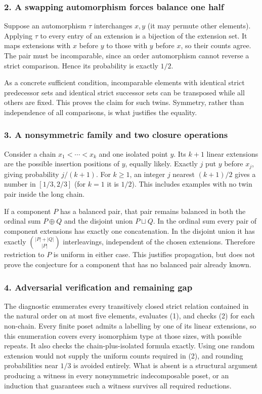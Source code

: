 \documentclass[11pt,a4paper]{article}
\begin{document}
\subsubsection{2. A swapping automorphism forces balance one half}
Suppose an automorphism $\tau$ interchanges $x,y$ (it may permute other elements). Applying $\tau$ to every entry of an extension is a bijection of the extension set. It maps extensions with $x$ before $y$ to those with $y$ before $x$, so their counts agree. The pair must be incomparable, since an order automorphism cannot reverse a strict comparison. Hence its probability is exactly $1/2$.

As a concrete sufficient condition, incomparable elements with identical strict predecessor sets and identical strict successor sets can be transposed while all others are fixed. This proves the claim for such twins. Symmetry, rather than independence of all comparisons, is what justifies the equality.

\subsubsection{3. A nonsymmetric family and two closure operations}
Consider a chain $x_1<\cdots<x_k$ and one isolated point $y$. Its $k+1$ linear extensions are the possible insertion positions of $y$, equally likely. Exactly $j$ put $y$ before $x_j$, giving probability $j/(k+1)$. For $k\geq1$, an integer $j$ nearest $(k+1)/2$ gives a number in $[1/3,2/3]$ (for $k=1$ it is $1/2$). This includes examples with no twin pair inside the long chain.

If a component $P$ has a balanced pair, that pair remains balanced in both the ordinal sum $P\oplus Q$ and the disjoint union $P\sqcup Q$. In the ordinal sum every pair of component extensions has exactly one concatenation. In the disjoint union it has exactly $\binom{|P|+|Q|}{|P|}$ interleavings, independent of the chosen extensions. Therefore restriction to $P$ is uniform in either case. This justifies propagation, but does not prove the conjecture for a component that has no balanced pair already known.

\subsubsection{4. Adversarial verification and remaining gap}
The diagnostic enumerates every transitively closed strict relation contained in the natural order on at most five elements, evaluates (1), and checks (2) for each non-chain. Every finite poset admits a labelling by one of its linear extensions, so this enumeration covers every isomorphism type at those sizes, with possible repeats. It also checks the chain-plus-isolated formula exactly. Using one random extension would not supply the uniform counts required in (2), and rounding probabilities near $1/3$ is avoided entirely. What is absent is a structural argument producing a witness in every nonsymmetric indecomposable poset, or an induction that guarantees such a witness survives all required reductions.
\end{document}
